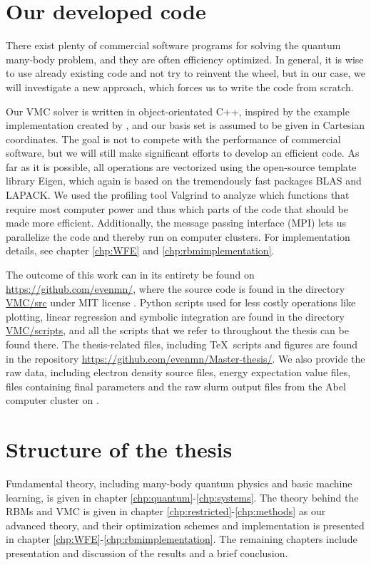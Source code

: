 \section{Our developed code}
There exist plenty of commercial software programs for solving the quantum many-body problem, and they are often efficiency optimized. In general, it is wise to use already existing code and not try to reinvent the wheel, but in our case, we will investigate a new approach, which forces us to write the code from scratch. 

Our VMC solver is written in object-orientated C++, inspired by the example implementation created by \citet{ledum_simple_2016}, and our basis set is assumed to be given in Cartesian coordinates. The goal is not to compete with the performance of commercial software, but we will still make significant efforts to develop an efficient code. As far as it is possible, all operations are vectorized using the open-source template library Eigen, which again is based on the tremendously fast packages BLAS and LAPACK. We used the profiling tool Valgrind to analyze which functions that require most computer power and thus which parts of the code that should be made more efficient. Additionally, the message passing interface (MPI) lets us parallelize the code and thereby run on computer clusters. For implementation details, see chapter \ref{chp:WFE} and \ref{chp:rbmimplementation}. 

The outcome of this work can in its entirety be found on \url{https://github.com/evenmn/}, where the source code is found in the directory \href{https://github.com/evenmn/VMC/tree/master/src}{VMC/src} under MIT license \cite{noauthor_mit_nodate}. Python scripts used for less costly operations like plotting, linear regression and symbolic integration are found in the directory \href{https://github.com/evenmn/VMC/tree/master/scripts}{VMC/scripts}, and all the scripts that we refer to throughout the thesis can be found there. The thesis-related files, including \TeX\, scripts and figures are found in the repository \url{https://github.com/evenmn/Master-thesis/}. We also provide the raw data, including electron density source files, energy expectation value files, files containing final parameters and the raw slurm output files from the Abel computer cluster on \cite{nordhagen_even_marius_2019_3477946}.

\section{Structure of the thesis}
Fundamental theory, including many-body quantum physics and basic machine learning, is given in chapter \ref{chp:quantum}-\ref{chp:systems}. The theory behind the RBMs and VMC is given in chapter \ref{chp:restricted}-\ref{chp:methods} as our advanced theory, and their optimization schemes and implementation is presented in chapter \ref{chp:WFE}-\ref{chp:rbmimplementation}. The remaining chapters include presentation and discussion of the results and a brief conclusion.
